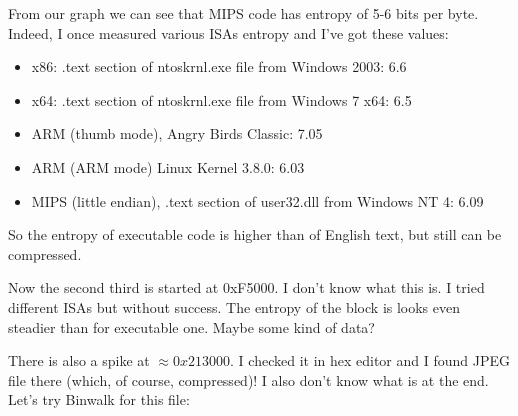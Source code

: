 From our graph we can see that MIPS code has entropy of 5-6 bits per byte.
Indeed, I once measured various \ac{ISA}s entropy and I've got these values:

\begin{itemize}
\item x86: .text section of ntoskrnl.exe file from Windows 2003: 6.6
\item x64: .text section of ntoskrnl.exe file from Windows 7 x64: 6.5
\item ARM (thumb mode), Angry Birds Classic: 7.05
\item ARM (ARM mode) Linux Kernel 3.8.0: 6.03
\item MIPS (little endian), .text section of user32.dll from Windows NT 4: 6.09
\end{itemize}

So the entropy of executable code is higher than of English text, but still can be compressed.

Now the second third is started at 0xF5000. I don't know what this is. I tried different \ac{ISA}s but without success.
The entropy of the block is looks even steadier than for executable one.
Maybe some kind of data?

There is also a spike at $\approx 0x213000$.
I checked it in hex editor and I found JPEG file there (which, of course, compressed)!
I also don't know what is at the end.
Let's try Binwalk for this file:

